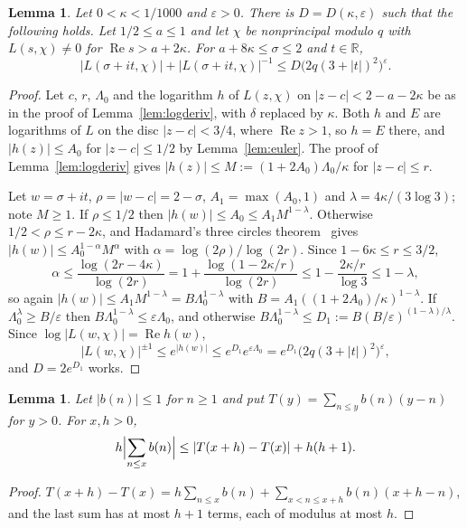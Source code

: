 \documentclass[12pt]{amsart}
\newtheorem{lemma}[theorem]{Lemma}
\theoremstyle{remark}
\renewcommand{\Re}{\operatorname{Re}}
\newcommand{\R}{\mathbb{R}}
\begin{document}
\begin{lemma}\label{lem:lindelof}
Let $0<\kappa<1/1000$ and $\varepsilon>0$. There is $D=D(\kappa,\varepsilon)$ such that the
following holds. Let $1/2\le a\le1$ and let $\chi$ be nonprincipal modulo $q$ with
$L(s,\chi)\ne0$ for $\Re s>a+2\kappa$. For $a+8\kappa\le\sigma\le2$ and $t\in\R$,
\[
  |L(\sigma+it,\chi)|+|L(\sigma+it,\chi)|^{-1}\le D\bigl(2q(3+|t|)^2\bigr)^\varepsilon.
\]
\end{lemma}

\begin{proof}
Let $c$, $r$, $\Lambda_0$ and the logarithm $h$ of $L(z,\chi)$ on $|z-c|<2-a-2\kappa$ be as in
the proof of Lemma~\ref{lem:logderiv}, with $\delta$ replaced by $\kappa$. Both $h$ and $E$ are
logarithms of $L$ on the disc $|z-c|<3/4$, where $\Re z>1$, so $h=E$ there, and
$|h(z)|\le A_0$ for $|z-c|\le1/2$ by Lemma~\ref{lem:euler}. The proof of
Lemma~\ref{lem:logderiv} gives $|h(z)|\le M:=(1+2A_0)\Lambda_0/\kappa$ for $|z-c|\le r$.

Let $w=\sigma+it$, $\rho=|w-c|=2-\sigma$, $A_1=\max(A_0,1)$ and $\lambda=4\kappa/(3\log3)$; note
$M\ge1$. If $\rho\le1/2$ then $|h(w)|\le A_0\le A_1M^{1-\lambda}$. Otherwise
$1/2<\rho\le r-2\kappa$, and Hadamard's three circles theorem~\cite[\S5.3]{Tit39} gives
$|h(w)|\le A_0^{1-\alpha}M^{\alpha}$ with $\alpha=\log(2\rho)/\log(2r)$. Since
$1-6\kappa\le r\le3/2$,
\[
  \alpha\le\frac{\log(2r-4\kappa)}{\log(2r)}=1+\frac{\log(1-2\kappa/r)}{\log(2r)}
  \le1-\frac{2\kappa/r}{\log3}\le1-\lambda,
\]
so again $|h(w)|\le A_1M^{1-\lambda}=B\Lambda_0^{1-\lambda}$ with
$B=A_1((1+2A_0)/\kappa)^{1-\lambda}$. If $\Lambda_0^\lambda\ge B/\varepsilon$ then
$B\Lambda_0^{1-\lambda}\le\varepsilon\Lambda_0$, and otherwise $B\Lambda_0^{1-\lambda}\le
D_1:=B(B/\varepsilon)^{(1-\lambda)/\lambda}$. Since $\log|L(w,\chi)|=\Re h(w)$,
\[
  |L(w,\chi)|^{\pm1}\le e^{|h(w)|}\le e^{D_1}e^{\varepsilon\Lambda_0}
  =e^{D_1}\bigl(2q(3+|t|)^2\bigr)^\varepsilon,
\]
and $D=2e^{D_1}$ works.
\end{proof}

\begin{lemma}\label{lem:unsmooth}
Let $|b(n)|\le1$ for $n\ge1$ and put $T(y)=\sum_{n\le y}b(n)(y-n)$ for $y>0$. For $x,h>0$,
\[
  h\Bigl|\sum_{n\le x}b(n)\Bigr|\le|T(x+h)-T(x)|+h(h+1).
\]
\end{lemma}

\begin{proof}
$T(x+h)-T(x)=h\sum_{n\le x}b(n)+\sum_{x<n\le x+h}b(n)(x+h-n)$, and the last sum has at most
$h+1$ terms, each of modulus at most $h$.
\end{proof}
\end{document}
